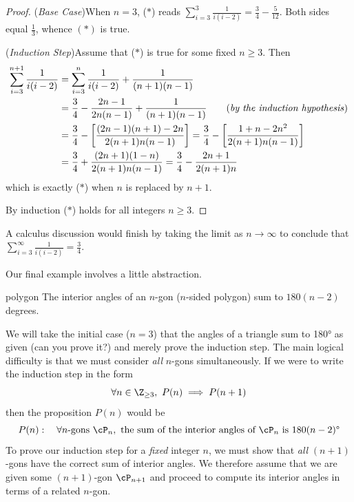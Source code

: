 \begin{proof}
	(\emph{Base Case})\quad When $n=3$, ($\ast$) reads $\sum\limits_{i=3}^3\frac 1{i(i-2)}=\frac 34-\frac 5{12}$. Both sides equal $\frac 13$, whence $(\ast)$ is true.\par
	(\emph{Induction Step})\quad Assume that ($\ast$) is true for some fixed $n\ge 3$. Then
	\begin{align*}
		\sum_{i=3}^{n+1}\frac 1{i(i-2)}&=\sum_{i=3}^{n}\frac 1{i(i-2)}+\frac 1{(n+1)(n-1)}\\
		&=\frac 34-\frac{2n-1}{2n(n-1)}+\frac 1{(n+1)(n-1)}\tag*{(\emph{by the induction hypothesis})}\\
		&=\frac 34-\left[\frac{(2n-1)(n+1)-2n}{2(n+1)n(n-1)}\right]=\frac 34-\left[\frac{1+n-2n^2}{2(n+1)n(n-1)}\right]\\
		&=\frac 34+\frac{(2n+1)(1-n)}{2(n+1)n(n-1)}=\frac 34-\frac{2n+1}{2(n+1)n}
	\end{align*}
	which is exactly ($\ast$) when $n$ is replaced by $n+1$.\par
	By induction ($\ast$) holds for all integers $n\ge 3$.
\end{proof}

A calculus discussion would finish by taking the limit as $n\to\infty$ to conclude that $\sum\limits_{i=3}^\infty\frac 1{i(i-2)}=\frac 34$.


Our final example involves a little abstraction.

\begin{thm}{}{polygon}
	The interior angles of an $n$-gon ($n$-sided polygon) sum to $180(n-2)$ degrees.
\end{thm}

We will take the initial case ($n=3$) that the angles of a triangle sum to \ang{180} as given (can you prove it?) and merely prove the induction step. The main logical difficulty is that we must consider \emph{all} $n$-gons simultaneously. If we were to write the induction step in the form
\[
	\forall n\in\Z_{\ge 3},\ P(n)\implies P(n+1)
\]
then the proposition $P(n)$ would be
\[
	P(n):\quad \forall n\text{-gons }\cP_n,\text{ the sum of the interior angles of $\cP_n$ is $180(n-2)$\textdegree}
\]
To prove our induction step for a \emph{fixed} integer $n$, we must show that \emph{all} $(n+1)$-gons have the correct sum of interior angles. We therefore assume that we are given some $(n+1)$-gon $\cP_{n+1}$ and proceed to compute its interior angles in terms of a related $n$-gon.

